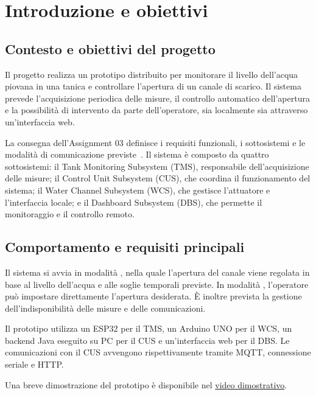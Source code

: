 \section{Introduzione e obiettivi}
\label{sec:introduction}

\subsection{Contesto e obiettivi del progetto}

Il progetto realizza un prototipo distribuito per monitorare il livello dell'acqua piovana in una tanica e controllare l'apertura di un canale di scarico.
Il sistema prevede l'acquisizione periodica delle misure, il controllo automatico dell'apertura e la possibilità di intervento da parte dell'operatore, sia localmente sia attraverso un'interfaccia web.

La consegna dell'Assignment 03 definisce i requisiti funzionali, i sottosistemi e le modalità di comunicazione previste~\cite{assignment03}.
Il sistema è composto da quattro sottosistemi:
il Tank Monitoring Subsystem (TMS), responsabile dell'acquisizione delle misure; il Control Unit Subsystem (CUS), che coordina il funzionamento del sistema; il Water Channel Subsystem (WCS), che gestisce l'attuatore e l'interfaccia locale; e il Dashboard Subsystem (DBS), che permette il monitoraggio e il controllo remoto.

\subsection{Comportamento e requisiti principali}

Il sistema si avvia in modalità , nella quale l'apertura del canale viene regolata in base al livello dell'acqua e alle soglie temporali previste.
In modalità , l'operatore può impostare direttamente l'apertura desiderata.
È inoltre prevista la gestione dell'indisponibilità delle misure e delle comunicazioni.

Il prototipo utilizza un ESP32 per il TMS, un Arduino UNO per il WCS, un backend Java eseguito su PC per il CUS e un'interfaccia web per il DBS.
Le comunicazioni con il CUS avvengono rispettivamente tramite MQTT, connessione seriale e HTTP.

Una breve dimostrazione del prototipo è disponibile nel
\href{https://drive.google.com/file/d/1wKVTIUwPTs25_GkaLXH3iHZbLNmnWJSF/view?usp=sharing}{video dimostrativo}.
